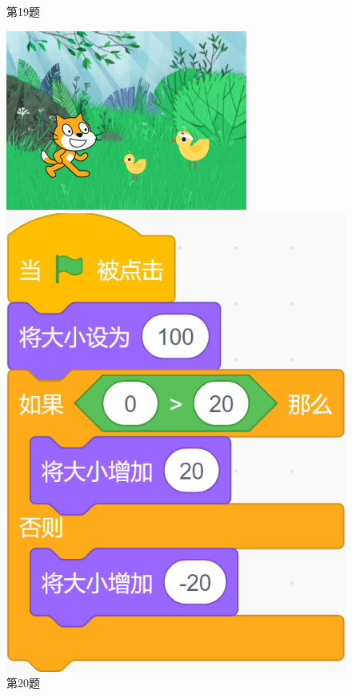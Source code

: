\documentclass[10pt, a4paper]{article}
\begin{document}
\begin{enumerate}
\begin{figure}[htbp]
\begin{minipage}[t]{.5\textwidth}
\begin{minipage}[t]{.38\textwidth}
                \end{minipage}
                \caption*{第19题}
            \end{minipage}
            \begin{minipage}[t]{.25\textwidth}
                \centering
                \includegraphics[width=\textwidth]{20.png}
                \caption*{第20题}
            \end{minipage}
            \begin{minipage}[t]{.14\textwidth}
                \centering
                \includegraphics[width=\textwidth]{23.png}

\end{minipage}
\end{figure}
\end{enumerate}
\end{document}
